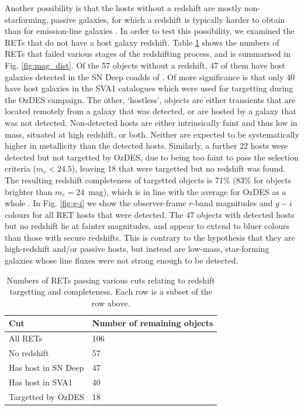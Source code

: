 \documentclass[fleqn,usenatbib,]{mnras}
\begin{document}
Another possibility is that the hosts without a redshift are mostly non-starforming, passive galaxies, for which a redshift is typically harder to obtain than for emission-line galaxies \citep{Yuan2015,Childress2017,Lidman2020}. In order to test this possibility, we examined the RETs that do not have a host galaxy redshift. Table \ref{tab:z_cuts} shows the numbers of RETs that failed various stages of the redshifting process, and is summarised in Fig. \ref{fig:mag_dist}. Of the 57 objects without a redshift, 47 of them have host galaxies detected in the SN Deep coadds of \citet{Wiseman2020}. Of more significance is that only 40 have host galaxies in the SVA1 catalogues which were used for targetting during the OzDES campaign. The other, `hostless', objects are either transients that are located remotely from a galaxy that was detected, or are hosted by a galaxy that was not detected. Non-detected hosts are either intrinsically faint and thus low in mass, situated at high redshift, or both. Neither are expected to be systematically higher in metallicity than the detected hosts. Similarly, a further 22 hosts were detected but not targetted by OzDES, due to being too faint to pass the selection criteria ($m_r < 24.5$), leaving 18 that were targetted but no redshift was found. The resulting redshift completeness of targetted objects is 71\% (83\% for objects brighter than $m_r = 24$~mag), which is in line with the average for OzDES as a whole \citep{Lidman2020}.
In Fig. \ref{fig:g-i} we show the observer-frame $r$-band magnitudes and $g-i$ colours for all RET hosts that were detected. The 47 objects with detected hosts but no redshift lie at fainter magnitudes, and appear to extend to bluer colours than those with secure redshifts. This is contrary to the hypothesis that they are high-redshift and/or passive hosts, but instead are low-mass, star-forming galaxies whose line fluxes were not strong enough to be detected. 
 

\begin{table}
    \centering
    \begin{tabular}{l|l}
         Cut &  Number of remaining objects \\
        \toprule
        All RETs & 106 \\
        No redshift   & 57\\
        Has host in SN Deep & 47\\
        Has host in SVA1 & 40 \\
        Targetted by OzDES & 18 \\
        \bottomrule
    \end{tabular}
    \caption{Numbers of RETs passing various cuts relating to redshift targetting and completeness. Each row is a subset of the row above.}
    \label{tab:z_cuts}
\end{table}
\end{document}

